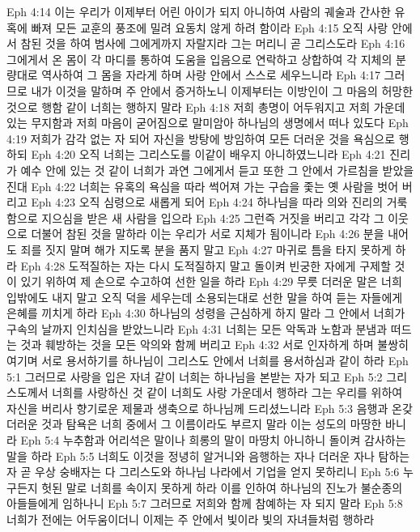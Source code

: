 Eph 4:14  이는 우리가 이제부터 어린 아이가 되지 아니하여 사람의 궤술과 간사한 유혹에 빠져 모든 교훈의 풍조에 밀려 요동치 않게 하려 함이라
Eph 4:15  오직 사랑 안에서 참된 것을 하여 범사에 그에게까지 자랄지라 그는 머리니 곧 그리스도라
Eph 4:16  그에게서 온 몸이 각 마디를 통하여 도움을 입음으로 연락하고 상합하여 각 지체의 분량대로 역사하여 그 몸을 자라게 하며 사랑 안에서 스스로 세우느니라
Eph 4:17  그러므로 내가 이것을 말하며 주 안에서 증거하노니 이제부터는 이방인이 그 마음의 허망한 것으로 행함 같이 너희는 행하지 말라
Eph 4:18  저희 총명이 어두워지고 저희 가운데 있는 무지함과 저희 마음이 굳어짐으로 말미암아 하나님의 생명에서 떠나 있도다
Eph 4:19  저희가 감각 없는 자 되어 자신을 방탕에 방임하여 모든 더러운 것을 욕심으로 행하되
Eph 4:20  오직 너희는 그리스도를 이같이 배우지 아니하였느니라
Eph 4:21  진리가 예수 안에 있는 것 같이 너희가 과연 그에게서 듣고 또한 그 안에서 가르침을 받았을 진대
Eph 4:22  너희는 유혹의 욕심을 따라 썩어져 가는 구습을 좇는 옛 사람을 벗어 버리고
Eph 4:23  오직 심령으로 새롭게 되어
Eph 4:24  하나님을 따라 의와 진리의 거룩함으로 지으심을 받은 새 사람을 입으라
Eph 4:25  그런즉 거짓을 버리고 각각 그 이웃으로 더불어 참된 것을 말하라 이는 우리가 서로 지체가 됨이니라
Eph 4:26  분을 내어도 죄를 짓지 말며 해가 지도록 분을 품지 말고
Eph 4:27  마귀로 틈을 타지 못하게 하라
Eph 4:28  도적질하는 자는 다시 도적질하지 말고 돌이켜 빈궁한 자에게 구제할 것이 있기 위하여 제 손으로 수고하여 선한 일을 하라
Eph 4:29  무릇 더러운 말은 너희 입밖에도 내지 말고 오직 덕을 세우는데 소용되는대로 선한 말을 하여 듣는 자들에게 은혜를 끼치게 하라
Eph 4:30  하나님의 성령을 근심하게 하지 말라 그 안에서 너희가 구속의 날까지 인치심을 받았느니라
Eph 4:31  너희는 모든 악독과 노함과 분냄과 떠드는 것과 훼방하는 것을 모든 악의와 함께 버리고
Eph 4:32  서로 인자하게 하며 불쌍히 여기며 서로 용서하기를 하나님이 그리스도 안에서 너희를 용서하심과 같이 하라
Eph 5:1  그러므로 사랑을 입은 자녀 같이 너희는 하나님을 본받는 자가 되고
Eph 5:2  그리스도께서 너희를 사랑하신 것 같이 너희도 사랑 가운데서 행하라 그는 우리를 위하여 자신을 버리사 향기로운 제물과 생축으로 하나님께 드리셨느니라
Eph 5:3  음행과 온갖 더러운 것과 탐욕은 너희 중에서 그 이름이라도 부르지 말라 이는 성도의 마땅한 바니라
Eph 5:4  누추함과 어리석은 말이나 희롱의 말이 마땅치 아니하니 돌이켜 감사하는 말을 하라
Eph 5:5  너희도 이것을 정녕히 알거니와 음행하는 자나 더러운 자나 탐하는 자 곧 우상 숭배자는 다 그리스도와 하나님 나라에서 기업을 얻지 못하리니
Eph 5:6  누구든지 헛된 말로 너희를 속이지 못하게 하라 이를 인하여 하나님의 진노가 불순종의 아들들에게 임하나니
Eph 5:7  그러므로 저희와 함께 참예하는 자 되지 말라
Eph 5:8  너희가 전에는 어두움이더니 이제는 주 안에서 빛이라 빛의 자녀들처럼 행하라

